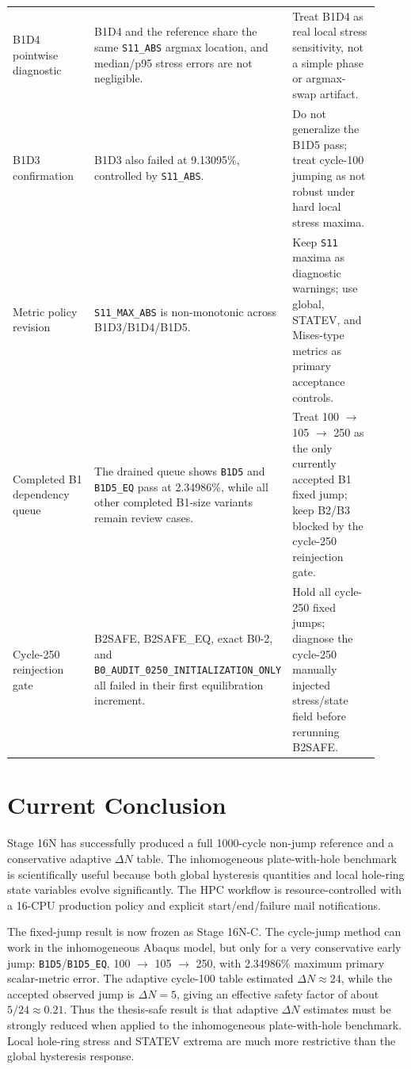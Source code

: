 \documentclass[11pt,a4paper]{article}
\newcommand{\code}[1]{\texttt{#1}}
\newcommand{\stage}{Stage 16N}
\begin{document}
\begin{longtable}{p{0.26\linewidth}p{0.34\linewidth}p{0.32\linewidth}}
B1D4 pointwise diagnostic & B1D4 and the reference share the same \code{S11\_ABS} argmax location, and median/p95 stress errors are not negligible. & Treat B1D4 as real local stress sensitivity, not a simple phase or argmax-swap artifact. \\
B1D3 confirmation & B1D3 also failed at 9.13095\%, controlled by \code{S11\_ABS}. & Do not generalize the B1D5 pass; treat cycle-100 jumping as not robust under hard local stress maxima. \\
Metric policy revision & \code{S11\_MAX\_ABS} is non-monotonic across B1D3/B1D4/B1D5. & Keep \code{S11} maxima as diagnostic warnings; use global, STATEV, and Mises-type metrics as primary acceptance controls. \\
Completed B1 dependency queue & The drained queue shows \code{B1D5} and \code{B1D5\_EQ} pass at 2.34986\%, while all other completed B1-size variants remain review cases. & Treat 100 $\rightarrow$ 105 $\rightarrow$ 250 as the only currently accepted B1 fixed jump; keep B2/B3 blocked by the cycle-250 reinjection gate. \\
Cycle-250 reinjection gate & B2SAFE, B2SAFE\_EQ, exact B0-2, and \code{B0\_AUDIT\_0250\_INITIALIZATION\_ONLY} all failed in their first equilibration increment. & Hold all cycle-250 fixed jumps; diagnose the cycle-250 manually injected stress/state field before rerunning B2SAFE. \\
\bottomrule
\end{longtable}

\section{Current Conclusion}

\stage{} has successfully produced a full 1000-cycle non-jump reference and a conservative adaptive $\Delta N$ table. The inhomogeneous plate-with-hole benchmark is scientifically useful because both global hysteresis quantities and local hole-ring state variables evolve significantly. The HPC workflow is resource-controlled with a 16-CPU production policy and explicit start/end/failure mail notifications.

The fixed-jump result is now frozen as Stage 16N-C. The cycle-jump method can work in the inhomogeneous Abaqus model, but only for a very conservative early jump: \code{B1D5}/\code{B1D5\_EQ}, 100 $\rightarrow$ 105 $\rightarrow$ 250, with 2.34986\% maximum primary scalar-metric error. The adaptive cycle-100 table estimated $\Delta N \approx 24$, while the accepted observed jump is $\Delta N = 5$, giving an effective safety factor of about $5/24 \approx 0.21$. Thus the thesis-safe result is that adaptive $\Delta N$ estimates must be strongly reduced when applied to the inhomogeneous plate-with-hole benchmark. Local hole-ring stress and STATEV extrema are much more restrictive than the global hysteresis response.
\end{document}
